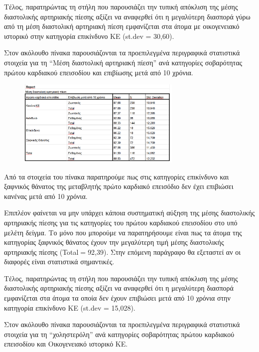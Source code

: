 Τέλος,  παρατηρώντας τη στήλη που παρουσιάζει την τυπική απόκλιση της μέσης διαστολικής αρτηριακής πίεσης αξίζει να αναφερθεί ότι η μεγαλύτερη διασπορά γύρω από τη μέση διαστολική αρτηριακή πίεση εμφανίζεται στα άτομα με οικογενειακό ιστορικό στην κατηγορία επικίνδυνο ΚΕ (st.dev = 30,60).  

\clearpage
Στον ακόλουθο πίνακα παρουσιάζονται τα προεπιλεγμένα περιγραφικά στατιστικά στοιχεία για τη “Μέση διαστολική αρτηριακή πίεση” ανά κατηγορίες σοβαρότητας πρώτου καρδιακού επεισοδίου και επιβίωσης μετά από 10 χρόνια.

\begin{figure}[hb]
        \centering
        \includegraphics[width=0.7\textwidth]{images/23.PNG}
    \end{figure}
    
    Από τα στοιχεία του πίνακα παρατηρούμε πως στις κατηγορίες επικίνδυνο και ξαφνικός θάνατος της μεταβλητής πρώτο καρδιακό επεισόδιο δεν έχει επιβιώσει κανένας μετά από 10 χρόνια.
    
Επιπλέον φαίνεται να μην υπάρχει κάποια συστηματική αύξηση της μέσης διαστολικής αρτηριακής πίεσης για τις κατηγορίες του πρώτου καρδιακού επεισοδίου στο υπό μελέτη δείγμα. Το μόνο που μπορούμε να παρατηρήσουμε είναι πως τα άτομα της κατηγορίας ξαφνικός θάνατος έχουν την μεγαλύτερη τιμή μέσης διαστολικής αρτηριακής πίεσης (Total$=$92,39).  Στην επόμενη παράγραφο θα εξεταστεί αν οι διαφορές είναι στατιστικά σημαντικές.

Τέλος,  παρατηρώντας τη στήλη που παρουσιάζει την τυπική απόκλιση της μέσης διαστολικής αρτηριακής πίεσης αξίζει να αναφερθεί ότι η μεγαλύτερη διασπορά  εμφανίζεται στα άτομα τα οποία δεν έχουν επιβιώσει μετά από 10 χρόνια στην κατηγορία επικίνδυνο ΚΕ (st.dev = 15,028). 

\clearpage
Στον ακόλουθο πίνακα παρουσιάζονται τα προεπιλεγμένα περιγραφικά στατιστικά στοιχεία για τη “χοληστερόλη” ανά κατηγορίες σοβαρότητας πρώτου καρδιακού επεισοδίου και Οικογενειακό ιστορικό ΚΕ.

